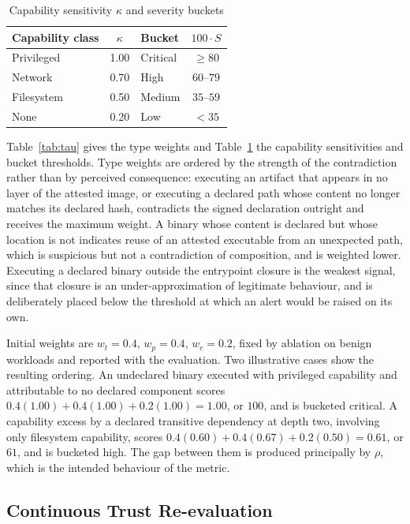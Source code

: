 \documentclass[conference]{IEEEtran}
\begin{document}
\begin{table}[!t]
\caption{Capability sensitivity $\kappa$ and severity buckets}
\label{tab:kappa}
\centering
\footnotesize
\begin{tabular}{lc@{\qquad}lc}
\toprule
Capability class & $\kappa$ & Bucket & $100\cdot S$ \\
\midrule
Privileged        & 1.00 & Critical & $\geq 80$ \\
Network           & 0.70 & High     & $60$--$79$ \\
Filesystem        & 0.50 & Medium   & $35$--$59$ \\
None              & 0.20 & Low      & $< 35$ \\
\bottomrule
\end{tabular}
\end{table}

Table~\ref{tab:tau} gives the type weights and Table~\ref{tab:kappa} the
capability sensitivities and bucket thresholds. Type weights are ordered
by the strength of the contradiction rather than by perceived
consequence: executing an artifact that appears in no layer of the
attested image, or executing a declared path whose content no longer
matches its declared hash, contradicts the signed declaration outright
and receives the maximum weight. A binary whose content is declared but
whose location is not indicates reuse of an attested executable from an
unexpected path, which is suspicious but not a contradiction of
composition, and is weighted lower. Executing a declared binary outside
the entrypoint closure is the weakest signal, since that closure is an
under-approximation of legitimate behaviour, and is deliberately placed
below the threshold at which an alert would be raised on its own.

Initial weights are $w_t = 0.4$, $w_p = 0.4$, $w_c = 0.2$, fixed by
ablation on benign workloads and reported with the evaluation. Two
illustrative cases show the resulting ordering. An undeclared binary
executed with privileged capability and attributable to no declared
component scores $0.4(1.00) + 0.4(1.00) + 0.2(1.00) = 1.00$, or $100$,
and is bucketed critical. A capability excess by a declared transitive
dependency at depth two, involving only filesystem capability, scores
$0.4(0.60) + 0.4(0.67) + 0.2(0.50) = 0.61$, or $61$, and is bucketed
high. The gap between them is produced principally by $\rho$, which is
the intended behaviour of the metric.

\subsection{Continuous Trust Re-evaluation}
\end{document}
